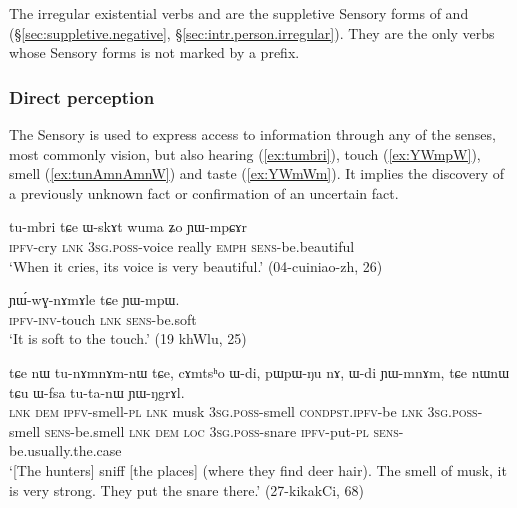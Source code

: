 The irregular existential verbs  and  are the suppletive Sensory forms of  and  (§\ref{sec:suppletive.negative}, §\ref{sec:intr.person.irregular}). They are the only verbs whose Sensory forms is not marked by a prefix. 



\subsubsection{Direct perception} \label{sec:sensory.evd}
The Sensory is used to express access to information \citep{tournadre14evidentiality} through any of the senses, most commonly vision, but also hearing (\ref{ex:tumbri}), touch (\ref{ex:YWmpW}), smell (\ref{ex:tunAmnAmnW}) and taste (\ref{ex:YWmWm}). It implies the discovery of a previously unknown fact or confirmation of an uncertain fact.

\begin{exe}
\ex \label{ex:tumbri}
\gll tu-mbri tɕe ɯ-skɤt wuma ʑo ɲɯ-mpɕɤr \\
\textsc{ipfv}-cry \textsc{lnk} \textsc{3sg}.\textsc{poss}-voice really \textsc{emph} \textsc{sens}-be.beautiful \\
\glt `When it cries, its voice is very beautiful.' (04-cuiniao-zh, 26)
\end{exe}

\begin{exe}
\ex \label{ex:YWmpW}
\gll ɲɯ́-wɣ-nɤmɤle tɕe ɲɯ-mpɯ. \\
\textsc{ipfv}-\textsc{inv}-touch \textsc{lnk} \textsc{sens}-be.soft \\
\glt `It is soft to the touch.' (19 khWlu, 25)
\end{exe}

\begin{exe}
\ex \label{ex:tunAmnAmnW}
\gll tɕe nɯ tu-nɤmnɤm-nɯ tɕe, cɤmtsʰo ɯ-di, pɯ\redp{}pɯ-ŋu nɤ, ɯ-di ɲɯ-mnɤm, tɕe nɯnɯ tɕu ɯ-fsa tu-ta-nɯ ɲɯ-ŋgrɤl. \\
\textsc{lnk} \textsc{dem} \textsc{ipfv}-smell-\textsc{pl} \textsc{lnk} musk \textsc{3sg}.\textsc{poss}-smell \textsc{cond\redp{}pst.ipfv}-be \textsc{lnk} \textsc{3sg}.\textsc{poss}-smell \textsc{sens}-be.smell \textsc{lnk} \textsc{dem} \textsc{loc} \textsc{3sg}.\textsc{poss}-snare \textsc{ipfv}-put-\textsc{pl} \textsc{sens}-be.usually.the.case \\
\glt `[The hunters] sniff [the places] (where they find deer hair). The smell of musk, it is very strong. They put the snare there.' (27-kikakCi, 68)
\end{exe}

